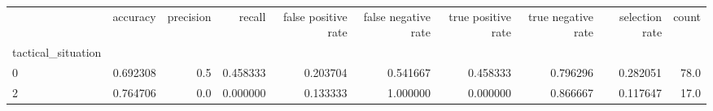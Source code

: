 \begin{tabular}{lrrrrrrrrr}
\toprule
{} &  accuracy &  precision &    recall &  false positive rate &  false negative rate &  true positive rate &  true negative rate &  selection rate &  count \\
tactical\_situation &           &            &           &                      &                      &                     &                     &                 &        \\
\midrule
0                  &  0.692308 &        0.5 &  0.458333 &             0.203704 &             0.541667 &            0.458333 &            0.796296 &        0.282051 &   78.0 \\
2                  &  0.764706 &        0.0 &  0.000000 &             0.133333 &             1.000000 &            0.000000 &            0.866667 &        0.117647 &   17.0 \\
\bottomrule
\end{tabular}
